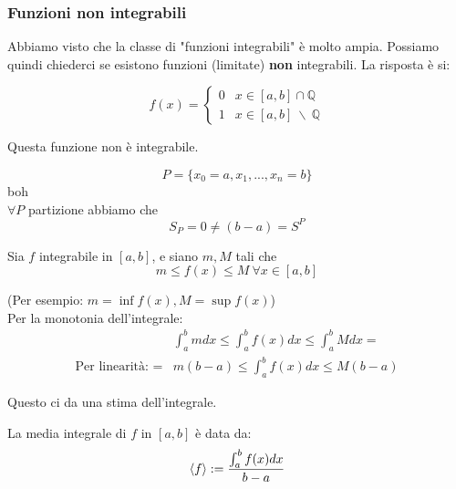 \subsubsection{Funzioni non integrabili}

Abbiamo visto che la classe di "funzioni integrabili" è molto ampia. Possiamo quindi chiederci se esistono funzioni (limitate) \textbf{non} integrabili. La risposta è si:
\begin{definizione}
    \begin{equation}
        f(x) = 
        \begin{cases}
            0 & x\in[a,b]\cap \mathbb{Q} \\
            1 & x\in[a,b]\ \backslash\ \mathbb{Q}
        \end{cases}
    \end{equation}

    Questa funzione non è integrabile.
\end{definizione}

\begin{dimostrazione}
    \begin{equation}
        P= \{x_0=a, x_1,..., x_n=b\}
    \end{equation}
    boh \\
    $\forall P$ partizione abbiamo che
    \begin{equation}
        S_{P}=0\not=(b-a)=S^P
    \end{equation}
\end{dimostrazione}

\begin{osservazione}
    Sia $f$ integrabile in $[a,b]$, e siano $m,M$ tali che
    \begin{equation}
        m \leq f(x) \leq M\ \forall x\in [a,b]
    \end{equation}

    (Per esempio: $m=\inf f(x),M=\sup f(x)$) \\
    Per la monotonia dell'integrale:
    \begin{align}
        & \int_{a}^{b} m dx \leq \int_{a}^{b} f(x) dx \leq \int_{a}^{b} M dx =\\
        \text{Per linearità: }=& m(b-a) \leq \int_{a}^{b} f(x) dx \leq M(b-a)
    \end{align}

    Questo ci da una stima dell'integrale.
\end{osservazione}

\begin{definizione}
    La media integrale di $f$ in $[a,b]$ è data da:
    \begin{equation}
        \left\langle{f}\right\rangle := \frac{\int_{a}^{b} f(x) dx}{b-a}
    \end{equation}
\end{definizione}

